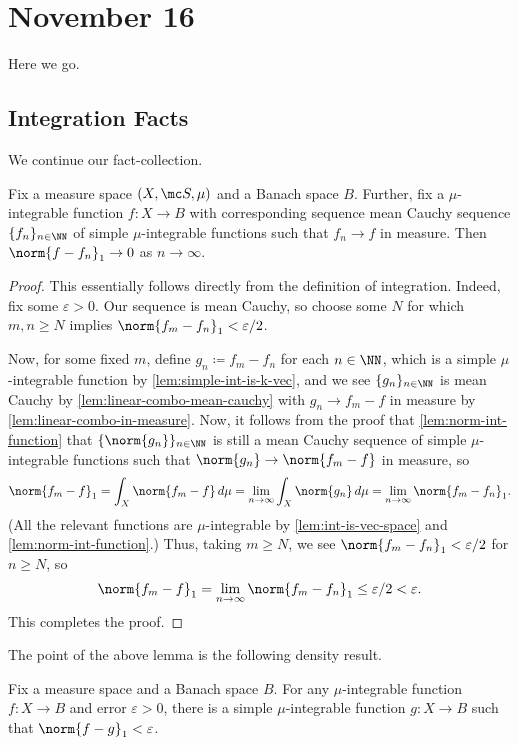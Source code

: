 \documentclass[../notes.tex]{subfiles}
\begin{document}
\section{November 16}

Here we go.

\subsection{Integration Facts}
We continue our fact-collection.
\begin{lemma} \label{lem:almost-simple-int-are-dense}
	Fix a measure space $(X,\mc S,\mu)$ and a Banach space $B$. Further, fix a $\mu$-integrable function $f\colon X\to B$ with corresponding sequence mean Cauchy sequence $\{f_n\}_{n\in\NN}$ of simple $\mu$-integrable functions such that $f_n\to f$ in measure. Then $\norm{f-f_n}_1\to0$ as $n\to\infty$.
\end{lemma}
\begin{proof}
	This essentially follows directly from the definition of integration. Indeed, fix some $\varepsilon>0$. Our sequence is mean Cauchy, so choose some $N$ for which $m,n\ge N$ implies $\norm{f_m-f_n}_1<\varepsilon/2$.
	
	Now, for some fixed $m$, define $g_n\coloneqq f_m-f_n$ for each $n\in\NN$, which is a simple $\mu$-integrable function by \autoref{lem:simple-int-is-k-vec}, and we see $\{g_n\}_{n\in\NN}$ is mean Cauchy by \autoref{lem:linear-combo-mean-cauchy} with $g_n\to f_m-f$ in measure by \autoref{lem:linear-combo-in-measure}. Now, it follows from the proof that \autoref{lem:norm-int-function} that $\{\norm{g_n}\}_{n\in\NN}$ is still a mean Cauchy sequence of simple $\mu$-integrable functions such that $\norm{g_n}\to\norm{f_m-f}$ in measure, so
	\[\norm{f_m-f}_1=\int_X\norm{f_m-f}\,d\mu=\lim_{n\to\infty}\int_X\norm{g_n}\,d\mu=\lim_{n\to\infty}\norm{f_m-f_n}_1.\]
	(All the relevant functions are $\mu$-integrable by \autoref{lem:int-is-vec-space} and \autoref{lem:norm-int-function}.) Thus, taking $m\ge N$, we see $\norm{f_m-f_n}_1<\varepsilon/2$ for $n\ge N$, so
	\[\norm{f_m-f}_1=\lim_{n\to\infty}\norm{f_m-f_n}_1\le\varepsilon/2<\varepsilon.\]
	This completes the proof.
\end{proof}
The point of the above lemma is the following density result.
\begin{corollary} \label{cor:simple-int-are-dense}
	Fix a measure space and a Banach space $B$. For any $\mu$-integrable function $f\colon X\to B$ and error $\varepsilon>0$, there is a simple $\mu$-integrable function $g\colon X\to B$ such that $\norm{f-g}_1<\varepsilon$.
\end{corollary}
\end{document}
